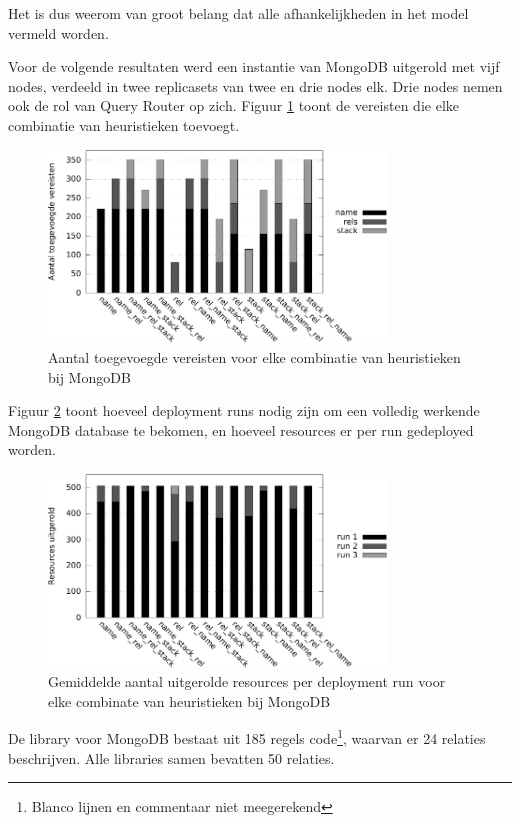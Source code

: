 Het is dus weerom  van groot belang dat alle afhankelijkheden in het model
vermeld worden.

Voor de volgende resultaten werd een instantie van MongoDB uitgerold met vijf nodes, verdeeld in twee replicasets van twee en drie nodes elk.
Drie nodes nemen ook de rol van Query Router op zich.
Figuur \ref{fig:reqs_mongo} toont de vereisten die elke combinatie van heuristieken toevoegt.

\begin{figure}[h]
    \begin{center}
    \includegraphics[width=0.8\textwidth]{images/reqs_mongo.pdf}
    \caption{Aantal toegevoegde vereisten voor elke combinatie van heuristieken bij MongoDB}
    \label{fig:reqs_mongo}
    \end{center}
\end{figure}

Figuur \ref{fig:time_runs_mongo} toont hoeveel deployment runs nodig zijn om een volledig werkende MongoDB database te bekomen, en hoeveel resources er
per run gedeployed worden.

\begin{figure}[h]
    \begin{center}
    \includegraphics[width=0.8\textwidth]{images/time_runs_mongo.pdf}
    \caption{Gemiddelde aantal uitgerolde resources per deployment run voor elke combinate van heuristieken bij MongoDB}
    \label{fig:time_runs_mongo}
    \end{center}
\end{figure}

De library voor MongoDB bestaat uit 185 regels code\footnote{Blanco lijnen en commentaar niet meegerekend}, waarvan er 24 relaties beschrijven.
Alle libraries samen bevatten 50 relaties. 
